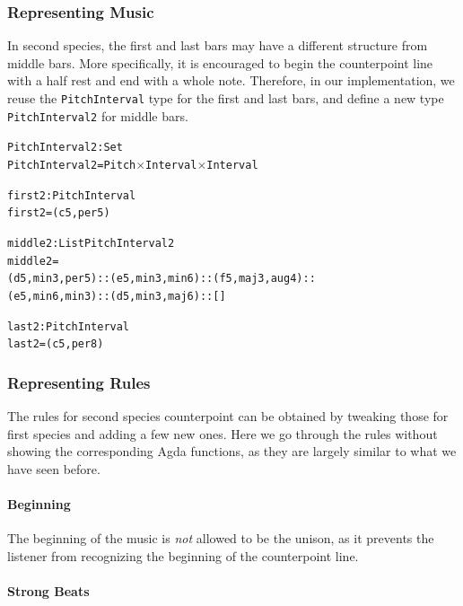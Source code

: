 \subsubsection{Representing Music}

In second species, the first and last bars may have a different structure
from middle bars.
More specifically, it is encouraged to begin the counterpoint line with
a half rest and end with a whole note.
Therefore, in our implementation, we reuse the \texttt{PitchInterval} 
type for the first and last bars, and define a new type
\texttt{PitchInterval2} for middle bars.

\begin{alltt}
PitchInterval2 : Set
PitchInterval2 = Pitch \(\times\) Interval \(\times\) Interval

first2 : PitchInterval
first2 = (c 5 , per5)

middle2 : List PitchInterval2
middle2 =
  (d 5 , min3 , per5) :: (e 5 , min3 , min6) :: (f 5 , maj3 , aug4) ::
  (e 5 , min6 , min3) :: (d 5 , min3 , maj6) :: []

last2 : PitchInterval
last2 = (c 5 , per8)
\end{alltt}

\subsubsection{Representing Rules}

The rules for second species counterpoint can be obtained by
tweaking those for first species and adding a few new ones.
Here we go through the rules without showing the corresponding
Agda functions, as they are largely similar to what we have seen
before.

\paragraph{Beginning}

The beginning of the music is \emph{not} allowed to be the unison,
as it prevents the listener from recognizing the beginning of the
counterpoint line.

\paragraph{Strong Beats}

